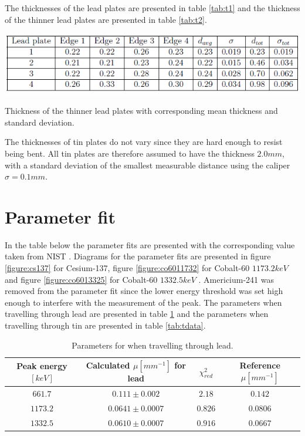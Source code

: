 \documentclass[12pt]{report}
\begin{document}
The thicknesses of the lead plates are presented in table \ref{tab:t1} and the thickness of the thinner lead plates are presented in table \ref{tab:t2}.

\begin{table}[ht]
    \centering
    \includegraphics[width=1\textwidth]{t2}
    \caption{Thickness of the thinner lead plates with corresponding mean thickness and standard deviation.}
    \label{tab:t2}
\end{table}

The thicknesses of tin plates do not vary since they are hard enough to resist being bent. All tin plates are therefore assumed to have the thickness $2.0mm$, with a standard deviation of the smallest measurable distance using the caliper $\sigma = 0.1mm$.

\section{Parameter fit}
In the table below the parameter fits are presented with the corresponding value taken from NIST \cite{nist}. Diagrams for the parameter fits are presented in figure \ref{figure:cs137} for Cesium-137, figure \ref{figure:co6011732} for Cobalt-60 $1173.2keV$ and figure \ref{figure:co6013325} for Cobalt-60 $1332.5keV$ . Americium-241 was removed from the parameter fit since the lower energy threshold was set high enough to interfere with the measurement of the peak. The parameters when travelling through lead are presented in table \ref{tab:ldata} and the parameters when travelling through tin are presented in table \ref{tab:tdata}.

\begin{table}[ht]
    \centering
    \begin{tabular}{|c|c|c|c|}
    \hline
        Peak energy $[keV]$ & Calculated $\mu [mm^{-1}]$ for lead   & $\chi^2_{red}$    & Reference $\mu [mm^{-1}]$ \\ \hline
        $661.7$               & $0.111 \pm 0.002$                   & $2.18$            & $0.142$\\ \hline
        $1173.2$              & $0.0641 \pm 0.0007$                 & $0.826$           & $0.0806$\\ \hline
        $1332.5$              & $0.0610 \pm 0.0007$                 & $0.916$           & $0.0667$\\ \hline
    \end{tabular}
    \caption{Parameters for when travelling through lead.}
    \label{tab:ldata}
\end{table}
\end{document}
